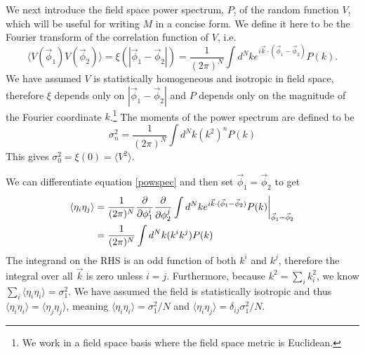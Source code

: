 \documentclass[12pt]{article}
\begin{document}
We next introduce the field space power spectrum, $P$, of the random function $V$, which will be useful for writing $M$ in a concise form. We define it here to be the Fourier transform of the correlation function of $V$, i.e.
%
\begin{equation}\label{powspec}
\langle V(\vec{\phi}_1) V(\vec{\phi}_2) \rangle = \xi(|\vec{\phi}_1-\vec{\phi}_2|)= \frac{1}{(2\pi)^N} \int d^Nk e^{i \vec{k} \cdot (\vec{\phi}_1-\vec{\phi}_2)} P(k).
\end{equation}
%
We have assumed $V$ is statistically homogeneous and isotropic in field space, therefore $\xi$ depends only on $|\vec{\phi}_1-\vec{\phi}_2|$ and  $P$ depends only on the magnitude of the Fourier coordinate $k$.\footnote{We work in a field space basis where the field space metric is Euclidean.} The moments of the power spectrum are defined to be
%
\begin{equation} \label{moments}
\sigma_n^2 = \frac{1}{(2\pi)^N}\int d^Nk (k^{2})^n P(k)
\end{equation}
%
This gives $\sigma_0^2=\xi(0)=\langle V^2 \rangle$.

We can differentiate equation \eqref{powspec} and then set $\vec{\phi}_1 = \vec{\phi}_2$ to get
%
\begin{align*}
\langle \eta_{i}\eta_{j}\rangle &= \frac{1}{(2\pi)^N} \frac{\partial}{\partial \phi_1^i}\frac{\partial}{\partial \phi_2^j} \int d^Nk e^{i \vec{k} \cdot (\vec{\phi}_1-\vec{\phi}_2)} P(k)\bigg{|}_{\vec{\phi}_1=\vec{\phi}_2}\\
&= \frac{1}{(2\pi)^N}\int d^Nk (k^i k^j) P(k)
\end{align*}
%
The integrand on the RHS is an odd function of both $k^i$ and $k^j$, therefore the integral over all $\vec{k}$ is zero unless $i=j$. Furthermore, because $k^2 = \sum_i k_i^2$, we know  $\sum_i \langle \eta_{i}\eta_{i}\rangle = \sigma_1^2$. We have assumed the field is statistically isotropic and thus $\langle \eta_{i}\eta_{i}\rangle=\langle \eta_{j}\eta_{j}\rangle$, meaning $\langle \eta_{i}\eta_{i}\rangle=\sigma_1^2/N$ and $\langle \eta_{i}\eta_{j}\rangle=\delta_{ij}\sigma_1^2/N$.

\end{document}
